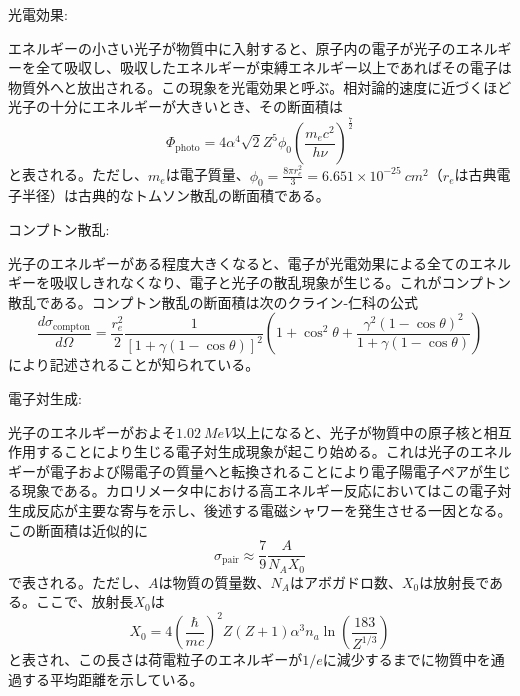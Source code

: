 \begin{description}
\item 光電効果:

エネルギーの小さい光子が物質中に入射すると、原子内の電子が光子のエネルギーを全て吸収し、吸収したエネルギーが束縛エネルギー以上であればその電子は物質外へと放出される。この現象を光電効果と呼ぶ。相対論的速度に近づくほど光子の十分にエネルギーが大きいとき、その断面積は
\begin{equation}
\Phi_{\mathrm{photo}} = 4\alpha^4 \sqrt{2} Z^5 \phi_0 \left(\frac{m_ec^2}{h\nu}\right)^{\frac{7}{2}}
\end{equation}
と表される\cite{HEPDetector}。ただし、$m_e$は電子質量、$\phi_0 = \frac{8\pi r_e^2}{3}=6.651\times 10^{-25}\SI{}{cm^2}$（$r_e$は古典電子半径）は古典的なトムソン散乱の断面積である。
	
	
\item コンプトン散乱:

光子のエネルギーがある程度大きくなると、電子が光電効果による全てのエネルギーを吸収しきれなくなり、電子と光子の散乱現象が生じる。これがコンプトン散乱である。コンプトン散乱の断面積は次のクライン-仁科の公式
\begin{equation}
\frac{d\sigma_{\mathrm{compton}}}{d\Omega}=\frac{r_e^2}{2}\frac{1}{[1+\gamma(1-\cos\theta)]^2}\left(1+\cos^2\theta+\frac{\gamma^2(1-\cos\theta)^2}{1+\gamma(1-\cos\theta)}\right)
\end{equation}
により記述されることが知られている。

\item 電子対生成:

光子のエネルギーがおよそ$\SI{1.02}{MeV}$以上になると、光子が物質中の原子核と相互作用することにより生じる電子対生成現象が起こり始める。これは光子のエネルギーが電子および陽電子の質量へと転換されることにより電子陽電子ペアが生じる現象である。カロリメータ中における高エネルギー反応においてはこの電子対生成反応が主要な寄与を示し、後述する電磁シャワーを発生させる一因となる。この断面積は近似的に
\begin{equation}
\sigma_{\mathrm{pair}} \approx \frac{7}{9}\frac{A}{N_AX_0}
\end{equation}
で表される。ただし、$A$は物質の質量数、$N_A$はアボガドロ数、$X_0$は放射長である。ここで、放射長$X_0$は
\begin{equation}
X_0= 4\left(\frac{\hbar}{mc}\right)^2Z(Z+1)\alpha^3n_a\ln\left(\frac{183}{Z^{1/3}}\right)
\end{equation}
と表され、この長さは荷電粒子のエネルギーが$1/e$に減少するまでに物質中を通過する平均距離を示している。

\end{description}
	
